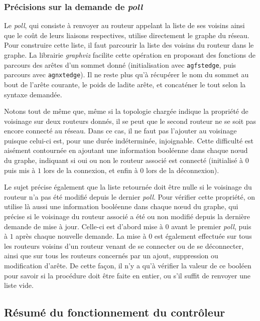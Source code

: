 \documentclass[a4paper,11pt]{article}
\begin{document}
\subsubsection*{Précisions sur la demande de \textit{poll}}

Le \textit{poll}, qui consiste à renvoyer au routeur appelant la liste de ses voisins ainsi que le coût de leurs liaisons respectives, utilise directement le graphe du réseau. Pour construire cette liste, il faut parcourir la liste des voisins du routeur dans le graphe. La librairie \textit{graphviz} facilite cette opération en proposant des fonctions de parcours des arêtes d'un sommet donné (initialisation avec \texttt{agfstedge}, puis parcours avec \texttt{agnxtedge}). Il ne reste plus qu'à récupérer le nom du sommet au bout de l'arête courante, le poids de ladite arête, et concaténer le tout selon la syntaxe demandée.

Notons tout de même que, même si la topologie chargée indique la propriété de voisinage sur deux routeurs donnés, il se peut que le second routeur ne se soit pas encore connecté au réseau. Dans ce cas, il ne faut pas l'ajouter au voisinage puisque celui-ci est, pour une durée indéterminée, injoignable. Cette difficulté est aisément contournée en ajoutant une information booléenne dans chaque n\oe ud du graphe, indiquant si oui ou non le routeur associé est connecté (initialisé à $0$ puis mis à $1$ lors de la connexion, et enfin à $0$ lors de la déconnexion).

Le sujet précise également que la liste retournée doit être nulle si le voisinage du routeur n'a pas été modifié depuis le dernier \textit{poll}. Pour vérifier cette propriété, on utilise là aussi une information booléenne dans chaque n\oe ud du graphe, qui précise si le voisinage du routeur associé a été ou non modifié depuis la dernière demande de mise à jour. Celle-ci est d'abord mise à $0$ avant le premier \textit{poll}, puis à $1$ après chaque nouvelle demande. La mise à $0$ est également effectuée sur tous les routeurs voisins d'un routeur venant de se connecter ou de se déconnecter, ainsi que sur tous les routeurs concernés par un ajout, suppression ou modification d'arête. De cette façon, il n'y a qu'à vérifier la valeur de ce booléen pour savoir si la procédure doit être faite en entier, ou s'il suffit de renvoyer une liste vide.

\subsection{Résumé du fonctionnement du contrôleur}
\end{document}
